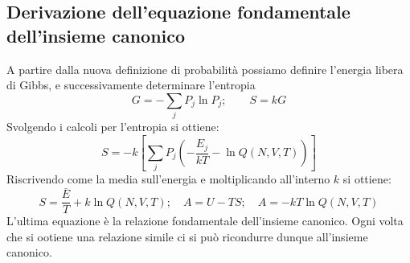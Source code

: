 \documentclass[oneside]{amsbook}
\numberwithin{section}{chapter}
\numberwithin{equation}{section}
\numberwithin{figure}{section}
\begin{document}
\subsection{Derivazione dell'equazione fondamentale dell'insieme canonico}
A partire dalla nuova definizione di probabilità possiamo definire l'energia libera di Gibbs, e successivamente determinare l'entropia
\begin{equation}
G= -\sum_j P_j \ln P_j; \quad \quad S=kG
\end{equation}
Svolgendo i calcoli per l'entropia si ottiene:
\begin{equation}
S=-k\left[\sum_j P_j \left(-\frac{E_j}{kT}-\ln Q (N,V,T) \right) \right]
\end{equation}
Riscrivendo come la media sull'energia e moltiplicando all'interno $k$ si ottiene:
\begin{equation}
S= \frac{\bar{E}}{T} +k \ln  Q (N,V,T); \quad A=U-TS; \quad A=-kT \ln  Q (N,V,T)
\end{equation}
L'ultima equazione è la relazione fondamentale dell'insieme canonico. Ogni volta che si ootiene una relazione simile ci si può ricondurre dunque all'insieme canonico.
\end{document}
